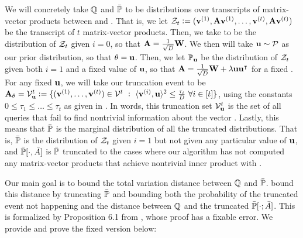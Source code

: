 We will concretely take \({\mathbb Q}\) and \(\bar{{\mathbb P}}\) to be distributions over transcripts of matrix-vector products between \cA and \mA.
That is, we let \({\mathcal Z}_t \;{\vcentcolon=}\; (\boldsymbol{\mathrm{v}}^{(1)},\mathbf{A}\boldsymbol{\mathrm{v}}^{(1)},\ldots,\boldsymbol{\mathrm{v}}^{(t)},\mathbf{A}\boldsymbol{\mathrm{v}}^{(t)})\) be the transcript of \(t\) matrix-vector products.
Then, we take \bbQ to be the distribution of \({\mathcal Z}_t\) given \(i=0\), so that \(\mathbf{A} = \frac1{\sqrt D}\mathbf{W}\).
We then will take \(\boldsymbol{\mathrm{u}}\sim{\mathcal P}\) as our prior distribution, so that \(\theta = \boldsymbol{\mathrm{u}}\).
Then, we let \({\mathbb P}_{\boldsymbol{\mathrm{u}}}\) be the distribution of \({\mathcal Z}_t\) given both \(i=1\) and a fixed value of \(\boldsymbol{\mathrm{u}}\), so that \(\mathbf{A} = \frac{1}{\sqrt D} \mathbf{W} + \lambda\boldsymbol{\mathrm{u}}\boldsymbol{\mathrm{u}}^\intercal\) for a fixed \vu.
For any fixed \(\boldsymbol{\mathrm{u}}\), we will take our truncation event to be \(\mathbf{A}_\theta = {\mathcal V}_{\boldsymbol{\mathrm{u}}}^t \;{\vcentcolon=}\; \{(\boldsymbol{\mathrm{v}}^{(1)},\ldots,\boldsymbol{\mathrm{v}}^{(t)})\in{\mathcal V}^t ~:~ \langle \boldsymbol{\mathrm{v}}^{(i)},\boldsymbol{\mathrm{u}}\rangle^2 \leq \frac{\tau_i}{D} ~ \forall i\in[t]\}\), using the constants \(0 \leq \tau_1 \leq \ldots \leq \tau_t\) as given in .
In words, this truncation set \({\mathcal V}_{\boldsymbol{\mathrm{u}}}^t\) is the set of all queries that fail to find nontrivial information about the vector \vu.
Lastly, this means that \(\bar{{\mathbb P}}\) is the marginal distribution of all the truncated distributions.
That is, \(\bar{{\mathbb P}}\) is the distribution of \({\mathcal Z}_t\) given \(i=1\) but not given any particular value of \(\boldsymbol{\mathrm{u}}\), and \(\bar{{\mathbb P}}[\cdot,\bar A]\) is \(\bar{{\mathbb P}}\) truncated to the cases where our algorithm has not computed any matrix-vector products that achieve nontrivial inner product with \vu.

Our main goal is to bound the total variation distance between \({\mathbb Q}\) and \(\bar{{\mathbb P}}\).
\cite{simchowitz2017gap} bound this distance by truncating \(\bar{{\mathbb P}}\) and bounding both the probability of the truncated event not happening and the distance between \({\mathbb Q}\) and the truncated \(\bar{{\mathbb P}}[\cdot;\bar A]\).
This is formalized by Proposition 6.1 from \cite{simchowitz2017gap}, whose proof has a fixable error.
We provide and prove the fixed version below:


